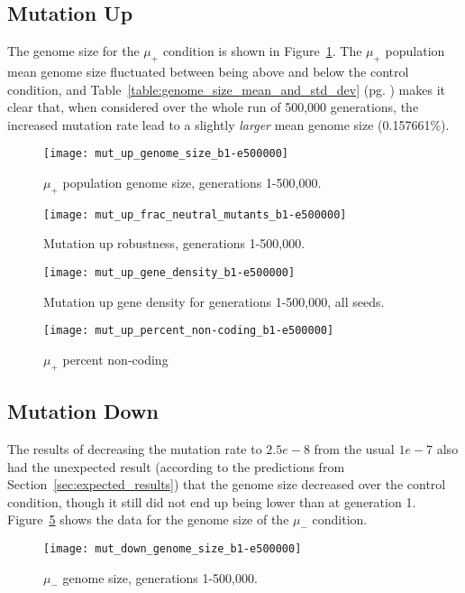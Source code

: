 \subsection{Mutation Up}
The genome size for the $\mu_+$ condition is shown in Figure~\ref{fig:mut_up_genome_size}. The $\mu_+$ population mean genome size fluctuated between being above and below the control condition, and Table~\ref{table:genome_size_mean_and_std_dev} (pg. \pageref{table:genome_size_mean_and_std_dev}) makes it clear that, when considered over the whole run of 500,000 generations, the increased mutation rate lead to a slightly \textit{larger} mean genome size (0.157661\%). 
\begin{figure}[H]
	\centering
	\texttt{[image: mut\_up\_genome\_size\_b1-e500000]}
	\caption[Mutation down genome size]{$\mu_+$ population genome size, generations 1-500,000.}
	\label{fig:mut_up_genome_size}
\end{figure}

\begin{figure}[H]
	\centering
	\texttt{[image: mut\_up\_frac\_neutral\_mutants\_b1-e500000]}
	\caption[Mutation up robustness]{Mutation up robustness, generations 1-500,000.}
	\label{fig:mut_up_robustness}
\end{figure}

\begin{figure}[H]
	\centering
	\texttt{[image: mut\_up\_gene\_density\_b1-e500000]}
	\caption[Mutation up gene density]{Mutation up gene density for generations 1-500,000, all seeds.}
	\label{fig:mut_up_gene_density}
\end{figure}

\begin{figure}[H]
	\centering
	\texttt{[image: mut\_up\_percent\_non-coding\_b1-e500000]}
	\caption[Mutation up - percent non-coding]{$\mu_+$ percent non-coding}
	\label{fig:mut_up_percent_non-coding}
\end{figure}

\subsection{Mutation Down}
The results of decreasing the mutation rate to $2.5e-8$ from the usual $1e-7$ also had the unexpected result (according to the predictions from Section~\ref{sec:expected_results}) that the genome size decreased over the control condition, though it still did not end up being lower than at generation 1. Figure~\ref{fig:mut_down:genome_size} shows the data for the genome size of the $\mu_-$ condition.
\begin{figure}[H]
	\centering
	\texttt{[image: mut\_down\_genome\_size\_b1-e500000]}
	\caption[Mutation down genome size]{$\mu_-$ genome size, generations 1-500,000.}
	\label{fig:mut_down:genome_size}
\end{figure}

